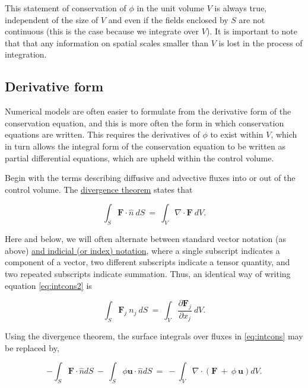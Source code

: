 This statement of conservation of $\phi$ in the unit volume $V$ is always true, independent of the 
size of $V$ and even if the fields enclosed by $S$ are not continuous (this is the case because we
integrate over $V$). It is important to note that that any information on spatial scales smaller than $V$ 
is lost in the process of integration.

\subsection{Derivative form}

Numerical models are often easier to formulate from the derivative form of the conservation equation, and this
is more often the form in which conservation equations are written. This requires the derivatives of $\phi$ to exist 
within $V$, which in turn allows the integral form of the conservation equation to be written as partial differential 
equations, which are upheld within the control volume.

Begin with the terms describing diffusive and advective fluxes into or out of the control volume. The
\href{http://en.wikipedia.org/wiki/Divergence_theorem}{divergence theorem} states that

\begin{equation}
{ \int }_{S} {\mathbf F} {\cdot} \hat{n} ~dS~ = ~{ \int }_{V} \nabla 
    {\cdot} {\mathbf F} ~dV. 
    \label{eq:intcons2}
\end{equation}

Here and below, we will often alternate between standard vector notation (as above) \href{http://en.wikipedia.org/wiki/Index_notation}{and 
indicial (or index) notation}, where a single subscript indicates a component of a vector, two different subscripts indicate a tensor quantity, 
and two repeated subscripts indicate summation. Thus, an identical way of writing equation \eqref{eq:intcons2} is 

\begin{equation}
{ \int }_{ S} {\mathbf F}_{ j} ~n_{ j} ~dS~ = ~{ \int }_{ V} {\frac{
    \partial {\mathbf F}_{ j} }{ \partial x_{ j} }} ~dV.
\end{equation}

Using the divergence theorem, the surface integrals over fluxes in \eqref{eq:intcons} may be replaced by,

\begin{equation}
-{ \int }_{ S} {\mathbf F} {\cdot} \hat{n}dS~ - ~{ \int }_{ S} \phi {\mathbf u}
    {\cdot}\hat{n} dS~ = ~ -{ \int }_{ V} \nabla {\cdot} \left ( {
    {\mathbf F}~ + ~ \phi ~ {\mathbf u}} \right )dV.
\end{equation}

